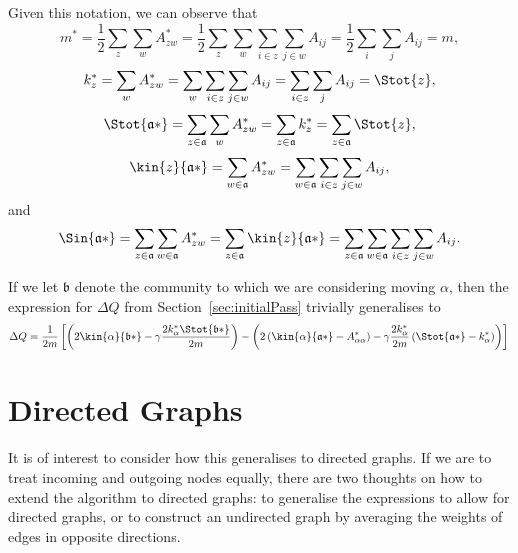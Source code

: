 \documentclass{article}
\begin{document}
Given this notation, we can observe that
\begin{equation}
m^* = \frac{1}{2}\sum_{z}\sum_{w}{A_{zw}^*} = \frac{1}{2}\sum_{z}\sum_{w}{\sum_{i \in z}\sum_{j \in w}A_{ij}} = \frac{1}{2}\sum_i\sum_jA_{ij} = m,
\end{equation}
\begin{equation}
k_{z}^* = \sum_{w}{A_{zw}^*} =  \sum_{w}{\sum_{i \in z}\sum_{j \in w}A_{ij}} = \sum_{i \in z}\sum_{j}A_{ij} = \Stot{z},
\end{equation}
\begin{equation}
	\Stot{\mathfrak{a} *} = \sum_{z \in \mathfrak{a}}\sum_{w}A_{zw}^* = \sum_{z \in \mathfrak{a}}k_z^* = \sum_{z \in \mathfrak{a}}\Stot{z},
\end{equation}
\begin{equation}
	\kin{z}{\mathfrak{a} *} = \sum_{w \in \mathfrak{a}}{A_{zw}^*} = \sum_{w \in \mathfrak{a}}{\sum_{i \in z}\sum_{j \in w}A_{ij}},
\end{equation}
and
\begin{equation}
\Sin{\mathfrak{a} *} = \sum_{z \in \mathfrak{a}}\sum_{w \in \mathfrak{a}}A_{zw}^* = \sum_{z \in \mathfrak{a}}\kin{z}{\mathfrak{a} *} = \sum_{z \in \mathfrak{a}}\sum_{w \in \mathfrak{a}}{\sum_{i \in z}\sum_{j \in w}A_{ij}}.
\end{equation}

If we let $\mathfrak{b}$ denote the community to which we are considering moving $\alpha$,
then the expression for $\Delta Q$ from Section~\ref{sec:initialPass} trivially generalises to
\begin{equation}
\Delta Q = \frac{1}{2m}\left[ \left( 2 \kin{\alpha}{\mathfrak{b} *} - \gamma \frac{2k_{\alpha}^*\Stot{\mathfrak{b} *}}{2m} \right) 
		- \left( 2\left( \kin{\alpha}{\mathfrak{a} *} - A_{\alpha \alpha}^* \right) - \gamma \frac{2k_{\alpha}^*}{2m} \left( \Stot{\mathfrak{a} *} - k_{\alpha}^* \right ) \right) \right] \\
\end{equation}

\section{Directed Graphs}
\label{sec:directedGraphs}

It is of interest to consider how this generalises to directed graphs.
If we are to treat incoming and outgoing nodes equally, there are two 
thoughts on how to extend the algorithm to directed graphs: to generalise
the expressions to allow for directed graphs, or to construct an undirected
graph by averaging the weights of edges in opposite directions.
\end{document}
